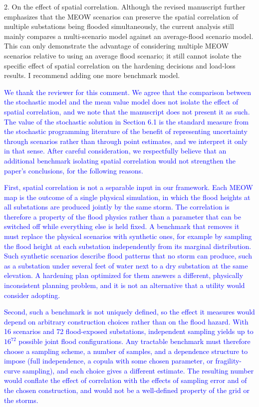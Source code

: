 \documentclass[authoryear,preprint,review,12pt]{elsarticle}\usepackage{amssymb}
\begin{document}
\bigskip

2. On the effect of spatial correlation. Although the revised manuscript further emphasizes that the MEOW scenarios can preserve the spatial correlation of multiple substations being flooded simultaneously, the current analysis still mainly compares a multi-scenario model against an average-flood scenario model. This can only demonstrate the advantage of considering multiple MEOW scenarios relative to using an average flood scenario; it still cannot isolate the specific effect of spatial correlation on the hardening decisions and load-loss results. I recommend adding one more benchmark model.

\textcolor{blue}{We thank the reviewer for this comment. We agree that the comparison between the stochastic model and the mean value model does not isolate the effect of spatial correlation, and we note that the manuscript does not present it as such. The value of the stochastic solution in Section 6.1 is the standard measure from the stochastic programming literature of the benefit of representing uncertainty through scenarios rather than through point estimates, and we interpret it only in that sense. After careful consideration, we respectfully believe that an additional benchmark isolating spatial correlation would not strengthen the paper's conclusions, for the following reasons.}

\textcolor{blue}{First, spatial correlation is not a separable input in our framework. Each MEOW map is the outcome of a single physical simulation, in which the flood heights at all substations are produced jointly by the same storm. The correlation is therefore a property of the flood physics rather than a parameter that can be switched off while everything else is held fixed. A benchmark that removes it must replace the physical scenarios with synthetic ones, for example by sampling the flood height at each substation independently from its marginal distribution. Such synthetic scenarios describe flood patterns that no storm can produce, such as a substation under several feet of water next to a dry substation at the same elevation. A hardening plan optimized for them answers a different, physically inconsistent planning problem, and it is not an alternative that a utility would consider adopting.}

\textcolor{blue}{Second, such a benchmark is not uniquely defined, so the effect it measures would depend on arbitrary construction choices rather than on the flood hazard. With 16 scenarios and 72 flood-exposed substations, independent sampling yields up to $16^{72}$ possible joint flood configurations. Any tractable benchmark must therefore choose a sampling scheme, a number of samples, and a dependence structure to impose (full independence, a copula with some chosen parameter, or fragility-curve sampling), and each choice gives a different estimate. The resulting number would conflate the effect of correlation with the effects of sampling error and of the chosen construction, and would not be a well-defined property of the grid or the storms.}
\end{document}
